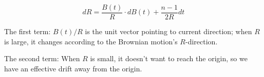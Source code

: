 \[
d R= \frac{B(t)}{R} \cdot d B(t)+\frac{n-1}{2 R} d t
\]

\begin{intuition}
    The first term: $B(t) / R$ is the unit vector pointing to current direction; when $R$ is large, it changes according to the Brownian motion's $R$-direction.

    The second term: When $R$ is small, it doesn't want to reach the origin, so we have an effective drift away from the origin. 
\end{intuition}